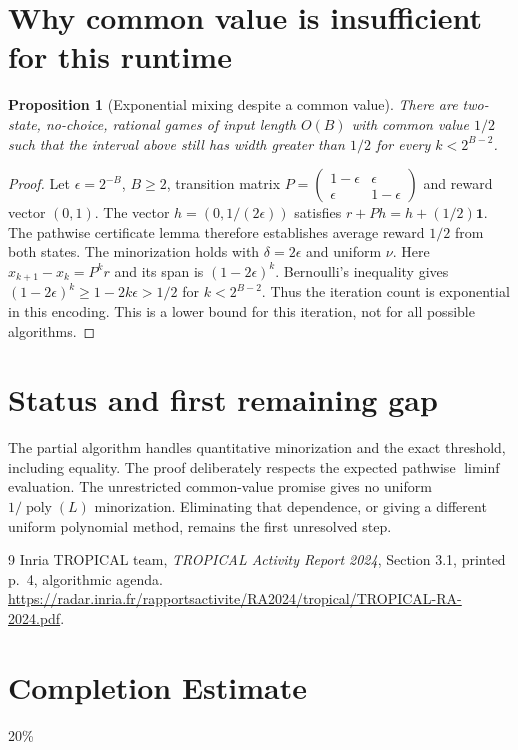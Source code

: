 \documentclass[11pt]{article}
\newtheorem{proposition}[theorem]{Proposition}
\theoremstyle{definition}
\begin{document}
\section{Why common value is insufficient for this runtime}
\begin{proposition}[Exponential mixing despite a common value]
There are two-state, no-choice, rational games of input length $O(B)$ with
common value $1/2$ such that the interval above still has width greater than
$1/2$ for every $k<2^{B-2}$.
\end{proposition}
\begin{proof}
Let $\epsilon=2^{-B}$, $B\geq2$, transition matrix
$P=\left(\begin{smallmatrix}1-\epsilon&\epsilon\\
\epsilon&1-\epsilon\end{smallmatrix}\right)$ and reward vector $(0,1)$.
The vector $h=(0,1/(2\epsilon))$ satisfies $r+Ph=h+(1/2)\mathbf1$.
The pathwise certificate lemma therefore establishes average reward $1/2$
from both states. The minorization holds with $\delta=2\epsilon$ and uniform
$\nu$.
Here $x_{k+1}-x_k=P^kr$ and its span is $(1-2\epsilon)^k$.
Bernoulli's inequality gives $(1-2\epsilon)^k\geq1-2k\epsilon>1/2$
for $k<2^{B-2}$. Thus the iteration count is exponential in this encoding.
This is a lower bound for this iteration, not for all possible algorithms.
\end{proof}

\section{Status and first remaining gap}
The partial algorithm handles quantitative minorization and the exact threshold,
including equality. The proof deliberately respects the expected pathwise
$\liminf$ evaluation. The unrestricted common-value promise gives no uniform
$1/\operatorname{poly}(L)$ minorization. Eliminating that dependence, or giving
a different uniform polynomial method, remains the first unresolved step.

\begin{thebibliography}{9}
 Inria TROPICAL team, \emph{TROPICAL Activity Report 2024},
Section 3.1, printed p.~4, algorithmic agenda.
\url{https://radar.inria.fr/rapportsactivite/RA2024/tropical/TROPICAL-RA-2024.pdf}.
\end{thebibliography}

\section{Completion Estimate}
20\%
\end{document}
